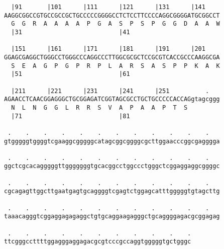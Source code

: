 \documentclass{article}
\begin{document}
\begin{Verbatim}
  |91       |101      |111      |121      |131      |141    
AAGGCGGCCGTGCCGCCGCTGCCCCCGGGGCCTCTCCTTCCCCAGGCGGGGATGCGGCCT
  G  G  R  A  A  A  A  P  G  A  S  P  S  P  G  G  D  A  A  W
  |31                           |41                         
  
  |151      |161      |171      |181      |191      |201    
GGAGCGAGGCTGGGCCTGGGCCCAGGCCCTTGGCGCGCTCCGCGTCACCGCCCAAGGCGA
  S  E  A  G  P  G  P  R  P  L  A  R  S  A  S  P  P  K  A  K
  |51                           |61                         
  
  |211      |221      |231      |241      |251          .   
AGAACCTCAACGGAGGGCTGCGGAGATCGGTAGCGCCTGCTGCCCCCACCAGgtagcggg
  N  L  N  G  G  L  R  R  S  V  A  P  A  A  P  T  S         
  |71                           |81                         
  
 .    .    .    .    .    .    .    .    .    .    .    .   
gtgggggtggggtcgaaggcgggggcatagcggcggggcgcttggaacccggcgagggga
  
 .    .    .    .    .    .    .    .    .    .    .    .   
ggctcgcacagggggttgggggggtgcacggcctggccctgggctcggaggaggcggggc
  
 .    .    .    .    .    .    .    .    .    .    .    .   
cgcagagttggcttgaatgagtgcaggggtcgagtctggagcatttgggggtgtagcttg
  
 .    .    .    .    .    .    .    .    .    .    .    .   
taaacagggtcggaggagagaggctgtgcaggaagagggctgcaggggagacgcggagag
  
 .    .    .    .    .    .    .    .    .    .    .
ttcgggccttttggagggaggagacgcgtcccgccaggtgggggtgctgggc
\end{Verbatim}
\newpage
\end{document}
